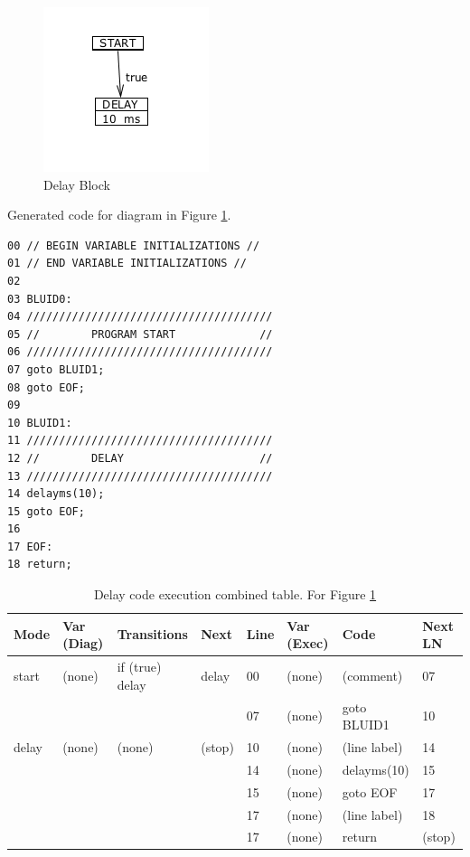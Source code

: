 \begin{figure}[h]
	\centering
	\includegraphics[width=\imgmedsmall]{./images/correctness_ex_delay.png}
	\caption{Delay Block}
	\label{fig:correctness_ex_delay}
\end{figure}

Generated  code for diagram in Figure \ref{fig:correctness_ex_delay}.
\begin{lstlisting}[frame=single]
00 // BEGIN VARIABLE INITIALIZATIONS //
01 // END VARIABLE INITIALIZATIONS //
02 
03 BLUID0:
04 //////////////////////////////////////
05 //        PROGRAM START             //
06 //////////////////////////////////////
07 goto BLUID1;
08 goto EOF;
09 
10 BLUID1:
11 //////////////////////////////////////
12 //        DELAY                     //
13 //////////////////////////////////////
14 delayms(10);
15 goto EOF;
16
17 EOF:
18 return;
\end{lstlisting}


\begin{table}[h]
	\caption{Delay code execution combined table. For Figure \ref{fig:correctness_ex_delay}}
	\centering
	\tablefontsize
		\begin{tabular}{| p{} | p{} | p{} | p{} | p{} | p{} | p{} | p{} |}
			\hline
			\textbf{Mode} 		&	\textbf{Var (Diag)} 		& 	\textbf{Transitions} 		& 	\textbf{Next}		&	\textbf{Line}		&	\textbf{Var (Exec)	}	&	\textbf{Code}	&	\textbf{Next LN} \\
			\hline
			start 				&	(none)						&	if (true) delay				&	delay				&	00					&	(none)					& 	(comment)		&	07 \\
			\hline
								&								&								&						&	07					& 	(none)					& 	goto BLUID1		& 	10 \\
			\hline
			delay				&	(none)						&	(none)						&	(stop)				&	10					&	(none)					&	(line label)	&	14 \\
			\hline
								&								&								&						&	14					&	(none)					&	delayms(10)		&	15 \\
			\hline
								&								&								&						&	15					&	(none)					&	goto EOF		&	17 \\
			\hline
								&								&								&						&	17					&	(none)					&	(line label)	&	18 \\
			\hline
								&								&								&						&	17					&	(none)					&	return			&	(stop) \\
			\hline
		\end{tabular}
	\label{table:DelayExecCombined}
\end{table}

